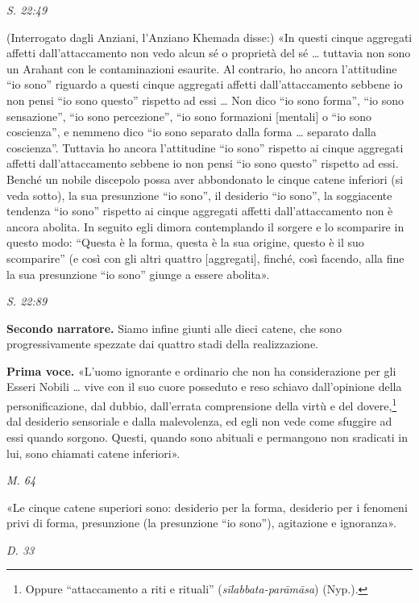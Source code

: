 \emph{S. 22:49}


(Interrogato dagli Anziani, l’Anziano Khemada disse:) «In questi cinque
aggregati affetti dall’attaccamento non vedo alcun sé o proprietà del sé
… tuttavia non sono un Arahant con le contaminazioni esaurite. Al
contrario, ho ancora l’attitudine “io sono” riguardo a questi cinque
aggregati affetti dall’attaccamento sebbene io non pensi “io sono
questo” rispetto ad essi … Non dico “io sono forma”, “io sono
sensazione”, “io sono percezione”, “io sono formazioni [mentali] o “io
sono coscienza”, e nemmeno dico “io sono separato dalla forma … separato
dalla coscienza”. Tuttavia ho ancora l’attitudine “io sono” rispetto ai
cinque aggregati affetti dall’attaccamento sebbene io non pensi “io sono
questo” rispetto ad essi. Benché un nobile discepolo possa aver
abbondonato le cinque catene inferiori (si veda sotto), la sua
presunzione “io sono”, il desiderio “io sono”, la soggiacente tendenza
“io sono” rispetto ai cinque aggregati affetti dall’attaccamento non è
ancora abolita. In seguito egli dimora contemplando il sorgere e lo
scomparire in questo modo: “Questa è la forma, questa è la sua origine,
questo è il suo scomparire” (e così con gli altri quattro [aggregati],
finché, così facendo, alla fine la sua presunzione “io sono” giunge a
essere abolita».


\emph{S. 22:89}


\textbf{Secondo narratore.} Siamo infine giunti alle dieci catene, che sono
progressivamente spezzate dai quattro stadi della realizzazione.


\textbf{Prima voce.} «L’uomo ignorante e ordinario che non ha considerazione per
gli Esseri Nobili … vive con il suo cuore posseduto e reso schiavo
dall’opinione della personificazione, dal dubbio, dall’errata
comprensione della virtù e del dovere,\footnote{Oppure “attaccamento a riti e rituali” (\emph{sīlabbata-parāmāsa}) (Nyp.).} dal desiderio
sensoriale e dalla malevolenza, ed egli non vede come sfuggire ad essi
quando sorgono. Questi, quando sono abituali e permangono non sradicati
in lui, sono chiamati catene inferiori».


\emph{M. 64}


«Le cinque catene superiori sono: desiderio per la forma, desiderio per
i fenomeni privi di forma, presunzione (la presunzione “io sono”),
agitazione e ignoranza».


\emph{D. 33}


